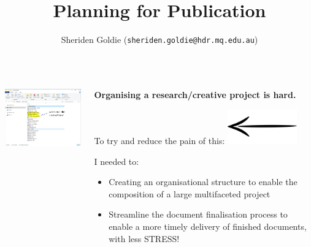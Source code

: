 \documentclass[unknownkeysallowed,usepdftitle=false, aspectratio=169,parskip=full]{beamer}
\title{Planning for Publication}
\author{Sheriden Goldie (\texttt{sheriden.goldie@hdr.mq.edu.au})}
\institute{Macquarie University, Sydney, NSW
}
\newcommand{\secvariable}{nothing}
\newcommand{\mysection}[1]{\renewcommand{\secvariable}{#1}
}
\begin{document}
\mysection{abstract}
\begin{frame}\label{\secvariable}



\begin{columns}[t]
  \begin{column}[c]{0.45\textwidth}



\includegraphics[width=7cm]{Images/MessyFolder.jpg}


 \vspace{12pt}
\end{column}


\begin{column}[c]{0.45\textwidth}

\textbf{Organising a research/creative project is hard.}
\vspace{6pt}

To try and reduce the pain of this:
\includegraphics[width=3cm]{Images/WayArrow.png}


I needed to:
\begin{itemize}
    \item Creating an organisational structure to enable the composition of a large multifaceted project
    \item Streamline the document finalisation process to enable a more timely delivery of finished documents, with less STRESS!
\end{itemize}

\end{column}

\end{columns}


\end{frame}
\end{document}
